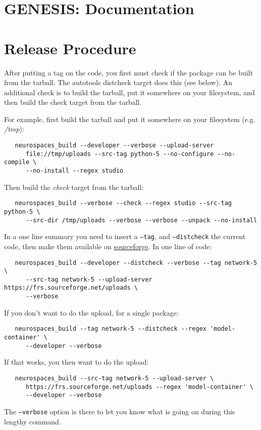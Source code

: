 \documentclass[12pt]{article}
\begin{document}
\section*{GENESIS: Documentation}

\section*{Release Procedure}

After putting a tag on the code, you first must check if the package can be built from the tarball. The autotools distcheck target does this (see below). An additional check is to build the tarball, put it somewhere on your filesystem, and then build the check target from the tarball. 

For example, first build the tarball and put it somewhere on your filesystem (e.g. {\it /tmp}):
\begin{verbatim}
   neurospaces_build --developer --verbose --upload-server 
      file://tmp/uploads --src-tag python-5 --no-configure --no-compile \
      --no-install --regex studio
\end{verbatim}
Then build the {\it check} target from the tarball:
\begin{verbatim}
   neurospaces_build --verbose --check --regex studio --src-tag python-5 \
      --src-dir /tmp/uploads --verbose --verbose --unpack --no-install
\end{verbatim}

In a one line summary you need to insert a {\tt --tag}, and {\tt --distcheck} the current code, then make them available on \href{http://sourceforge.net/projects/neurospaces/}{sourceforge}. In one line of code:
\begin{verbatim}
   neurospaces_build --developer --distcheck --verbose --tag network-5 \
      --src-tag network-5 --upload-server https://frs.sourceforge.net/uploads \
      --verbose
\end{verbatim}
If you don't want to do the upload, for a single package:
\begin{verbatim}
   neurospaces_build --tag network-5 --distcheck --regex 'model-container' \
      --developer --verbose
\end{verbatim}
If that works, you then want to do the upload:
\begin{verbatim}
   neurospaces_build --src-tag network-5 --upload-server \
      https://frs.sourceforge.net/uploads --regex 'model-container' \
      --developer --verbose
\end{verbatim}
The {\tt --verbose} option is there to let you know what is going on during this lengthy command.
\end{document}

